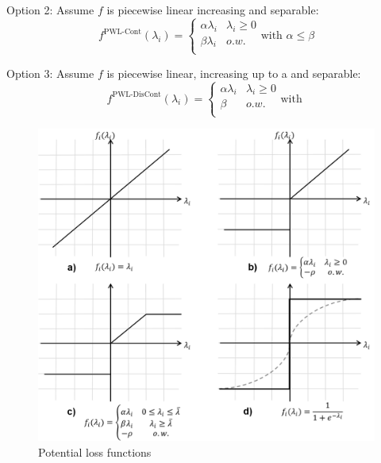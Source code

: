 \documentclass[]{article}
\begin{document}
Option 2: Assume $f$ is piecewise linear increasing and separable: 
\begin{equation}
f^{\textrm{PWL-Cont}}(\lambda_i) = \left\{
\begin{array}{ll}
\alpha \lambda_i & \lambda_i \geq 0 \\
\beta \lambda_i & o.w. \\
\end{array}
\right.
\textrm{with } \alpha \leq \beta
\end{equation}

Option 3: Assume $f$ is piecewise linear, increasing up to a  and separable: 
\begin{equation}
f^{\textrm{PWL-DisCont}}(\lambda_i) = \left\{
\begin{array}{ll}
\alpha \lambda_i & \lambda_i \geq 0 \\
\beta & o.w. \\
\end{array}
\right.
\textrm{with }
\end{equation}
 

\begin{figure}[htbp]
\begin{center}
\includegraphics[scale=0.7]{Loss_functions_concatenated.png}
\caption{Potential loss functions}
\label{fig:loss_functions_concatenated}
\end{center}
\end{figure}
\end{document}
